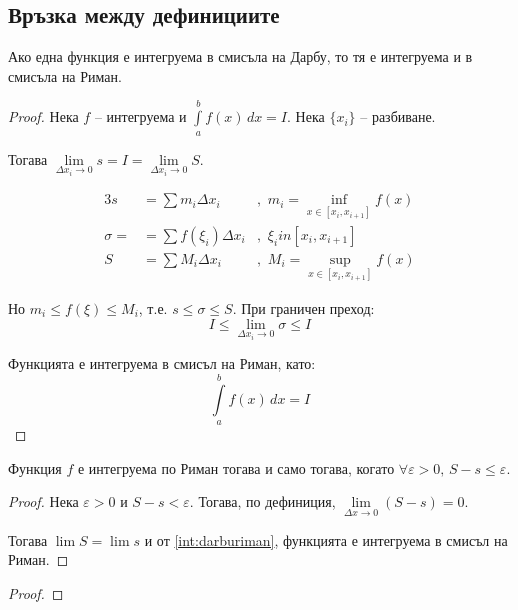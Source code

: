 \subsection{Връзка между дефинициите}

\begin{theorem}\label{int:darburiman}
    Ако една функция е интегруема в смисъла на Дарбу, то тя е интегруема и в смисъла на Риман.

    \begin{proof}
        Нека $f$ -- интегруема и $\int\limits_a^b f(x)\,dx = I$. Нека $\{x_i\}$ -- разбиване.

        Тогава $\lim\limits_{\Delta{x_i}\to0} s = I = \lim\limits_{\Delta{x_i}\to0} S$.

        \begin{alignat*}{3}
            s        & = \sum m_i \Delta{x_i}      & ,\,\, m_i = \inf_{x\in [x_i,x_{i+1}]} f(x) \\
            \sigma = & = \sum f(\xi_i) \Delta{x_i} & ,\,\, \xi_i in [x_i,x_{i+1}]               \\
            S        & = \sum M_i \Delta{x_i}      & ,\,\, M_i = \sup_{x\in [x_i,x_{i+1}]} f(x)
        \end{alignat*}

        Но $m_i \leq f(\xi) \leq M_i$, т.е. $s \leq \sigma \leq S$.
        При граничен преход:
        \[I \leq \lim_{\Delta x_i \to 0} \sigma \leq I\]

        Функцията е интегруема в смисъл на Риман, като:
        \[\int\limits_a^b f(x)\,dx = I\]
    \end{proof}
\end{theorem}

\begin{theorem}
    Функция $f$ е интегруема по Риман тогава и само тогава, когато $\forall{\varepsilon > 0},\, S-s\leq\varepsilon$.

    \begin{proof}
        Нека $\varepsilon > 0$ и $S-s<\varepsilon$. Тогава, по дефиниция, $\lim\limits_{\Delta{x}\to0}(S-s)=0$.

        Тогава $\lim S = \lim s$ и от \autoref{int:darburiman}, функцията е интегруема в смисъл на Риман.
    \end{proof}
    \begin{proof}
    \end{proof}
\end{theorem}

